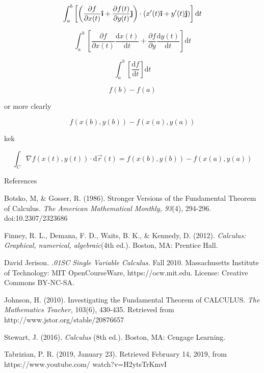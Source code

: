 \documentclass[11pt]{article}
\newcommand{\ihat}{\boldsymbol{\hat{\textbf{\i}}}}
\newcommand{\jhat}{\boldsymbol{\hat{\textbf{\j}}}}
\newcommand{\dx}{x^{\prime}(t)}
\newcommand{\dy}{y^{\prime}(t)}
\begin{document}
$$\int_a^b \left[ \left(\frac{\partial f}{\partial x(t)}\ihat+\frac{\partial f(t)}{\partial y(t)}\jhat\right)\cdot (\dx\ihat+\dy\jhat)\right]\mathrm{d}t$$

$$\int_a^b\left[\frac{\partial f}{\partial x(t)}\frac{\mathrm{d}x(t)}{\mathrm{d}t}+\frac{\partial f}{\partial y}\frac{\mathrm{d}y(t)}{\mathrm{d}t}\right]\mathrm{d}t$$

$$\int_a^b \left[\frac{\mathrm{d}f}{\mathrm{d}t}\right]\mathrm{d}t$$

$$f(b)-f(a)$$
\begin{center}
or more clearly
\end{center}
$$f(x(b),y(b))-f(x(a),y(a))$$\normalsize{}

kek

\Large{}$$\int_C \nabla f(x(t),y(t))\cdot \mathrm{d}\vec{r}(t) = f(x(b),y(b))-f(x(a),y(a))$$\normalsize{}
\pagebreak

{\centering{}References

}
\begin{hangparas}{0.5in}{1}
Botsko, M, \& Gosser, R. (1986). Stronger Versions of the Fundamental Theorem of Calculus. \textit{The American Mathematical Monthly, 93}(4), 294-296. doi:10.2307/2323686

Finney, R. L., Demana, F. D., Waits, B. K., \& Kennedy, D. (2012). \textit{Calculus: Graphical, numerical, algebraic}(4th ed.). Boston, MA: Prentice Hall.

David Jerison. \textit{.01SC Single Variable Calculus.} Fall 2010. Massachusetts Institute of Technology: MIT OpenCourseWare, https://ocw.mit.edu. License: Creative Commons BY-NC-SA.

Johnson, H. (2010). Investigating the Fundamental Theorem of CALCULUS. \textit{The Mathematics Teacher,} 103(6), 430-435. Retrieved from http://www.jstor.org/stable/20876657

Stewart, J. (2016). \textit{Calculus} (8th ed.). Boston, MA: Cengage Learning.

Tabrizian, P. R. (2019, January 23). Retrieved February 14, 2019, from https://www.youtube.com/
watch?v=H2ytsTrKmvI
\end{hangparas}
\end{document}

